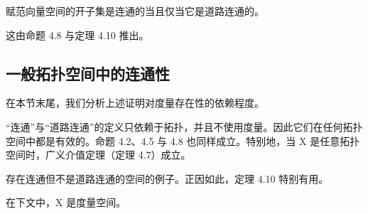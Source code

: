 \begin{corollary}

赋范向量空间的开子集是连通的当且仅当它是道路连通的。

\proofhead
这由命题 4.8 与定理 4.10 推出。
\end{corollary}

\subsection*{一般拓扑空间中的连通性}

在本节末尾，我们分析上述证明对度量存在性的依赖程度。

\begin{remark}

\begin{items}
\item

“连通”与“道路连通”的定义只依赖于拓扑，并且不使用度量。因此它们在任何拓扑空间中都是有效的。命题 4.2、4.5 与 4.8 也同样成立。特别地，当 X 是任意拓扑空间时，广义介值定理（定理 4.7）成立。

\item

存在连通但不是道路连通的空间的例子。正因如此，定理 4.10 特别有用。

\end{items}

\end{remark}

\exerciseshead

在下文中，X 是度量空间。

